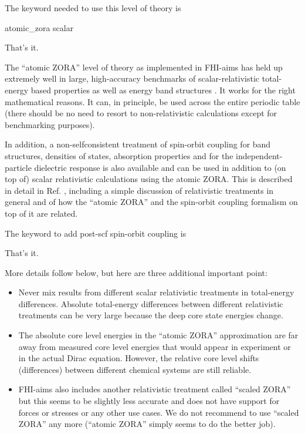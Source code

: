 The keyword needed to use this level of theory is

     atomic\_zora scalar

That's it.

The ``atomic ZORA'' level of theory as implemented in FHI-aims
has held up extremely well in large, high-accuracy benchmarks of
scalar-relativistic total-energy based properties
\cite{Lejaeghereaad3000} as well as energy band structures
\cite{Huhn2017_SOC}. It works for the right mathematical reasons. It
can, in principle, be used across the entire periodic table (there
should be no need to resort to non-relativistic calculations except
for benchmarking purposes). 

In addition, a non-selfconsistent treatment of spin-orbit coupling for
band structures, densities of states, absorption properties and for the
independent-particle dielectric response is also available and can be
used in addition to (on top of) scalar relativistic calculations using
the atomic ZORA. This is described in detail in
Ref. \cite{Huhn2017_SOC}, including a simple discussion of relativistic
treatments in general and of how the ``atomic ZORA'' and the
spin-orbit coupling formalism on top of it are related.

The keyword to add post-scf spin-orbit coupling is


That's it.

More details follow below, but here are three additional important
point:
\begin{itemize}
  \item Never mix results from different scalar relativistic
    treatments in total-energy differences. Absolute total-energy
    differences between different relativistic treatments can be very
    large because the deep core state energies change.
  \item The absolute core level energies in the ``atomic ZORA''
    approximation are far away from measured core level energies that
    would appear in experiment or in the actual Dirac
    equation. However, the relative core level shifts (differences)
    between different chemical systems are still reliable.
 \item FHI-aims also includes another relativistic treatment called
   ``scaled ZORA'' but this seems to be slightly less accurate and
   does not have support for forces or stresses or any other use
   cases. We do not recommend to use ``scaled ZORA'' any more
   (``atomic ZORA'' simply seems to do the better job).
\end{itemize}

